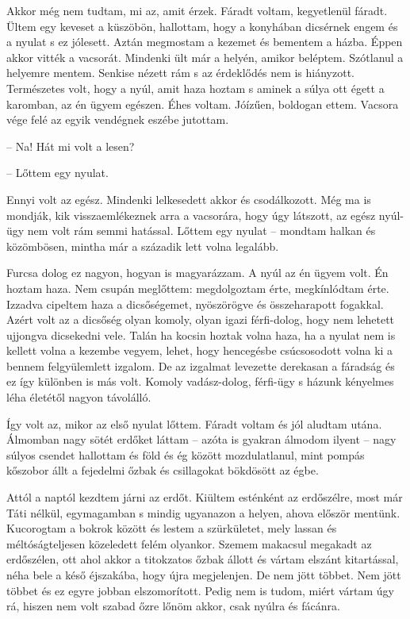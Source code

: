 \documentclass{IEEEtran}
\begin{document}
Akkor még nem tudtam, mi az, amit érzek. Fáradt voltam, kegyetlenül fáradt. Ültem egy keveset a küszöbön, hallottam, hogy a konyhában dicsérnek engem és a nyulat s ez jólesett. Aztán megmostam a kezemet és bementem a házba. Éppen akkor vitték a vacsorát. Mindenki ült már a helyén, amikor beléptem. Szótlanul a helyemre mentem. Senkise nézett rám s az érdeklődés nem is hiányzott. Természetes volt, hogy a nyúl, amit haza hoztam s aminek a súlya ott égett a karomban, az én ügyem egészen. Éhes voltam. Jóízűen, boldogan ettem. Vacsora vége felé az egyik vendégnek eszébe jutottam.

– Na! Hát mi volt a lesen?

– Lőttem egy nyulat.

Ennyi volt az egész. Mindenki lelkesedett akkor és csodálkozott. Még ma is mondják, kik visszaemlékeznek arra a vacsorára, hogy úgy látszott, az egész nyúl-ügy nem volt rám semmi hatással. Lőttem egy nyulat – mondtam halkan és közömbösen, mintha már a századik lett volna legalább.

Furcsa dolog ez nagyon, hogyan is magyarázzam. A nyúl az én ügyem volt. Én hoztam haza. Nem csupán meglőttem: megdolgoztam érte, megkínlódtam érte. Izzadva cipeltem haza a dicsőségemet, nyöszörögve és összeharapott fogakkal. Azért volt az a dicsőség olyan komoly, olyan igazi férfi-dolog, hogy nem lehetett ujjongva dicsekedni vele. Talán ha kocsin hoztak volna haza, ha a nyulat nem is kellett volna a kezembe vegyem, lehet, hogy hencegésbe csúcsosodott volna ki a bennem felgyülemlett izgalom. De az izgalmat levezette derekasan a fáradság és ez így különben is más volt. Komoly vadász-dolog, férfi-ügy s házunk kényelmes léha életétől nagyon távolálló.

Így volt az, mikor az első nyulat lőttem. Fáradt voltam és jól aludtam utána. Álmomban nagy sötét erdőket láttam – azóta is gyakran álmodom ilyent – nagy súlyos csendet hallottam és föld és ég között mozdulatlanul, mint pompás kőszobor állt a fejedelmi őzbak és csillagokat bökdösött az égbe.  

Attól a naptól kezdtem járni az erdőt. Kiültem esténként az erdőszélre, most már Táti nélkül, egymagamban s mindig ugyanazon a helyen, ahova először mentünk. Kucorogtam a bokrok között és lestem a szürkületet, mely lassan és méltóságteljesen közeledett felém olyankor. Szemem makacsul megakadt az erdőszélen, ott ahol akkor a titokzatos őzbak állott és vártam elszánt kitartással, néha bele a késő éjszakába, hogy újra megjelenjen. De nem jött többet. Nem jött többet és ez egyre jobban elszomorított. Pedig nem is tudom, miért vártam úgy rá, hiszen nem volt szabad őzre lőnöm akkor, csak nyúlra és fácánra.
\end{document}
